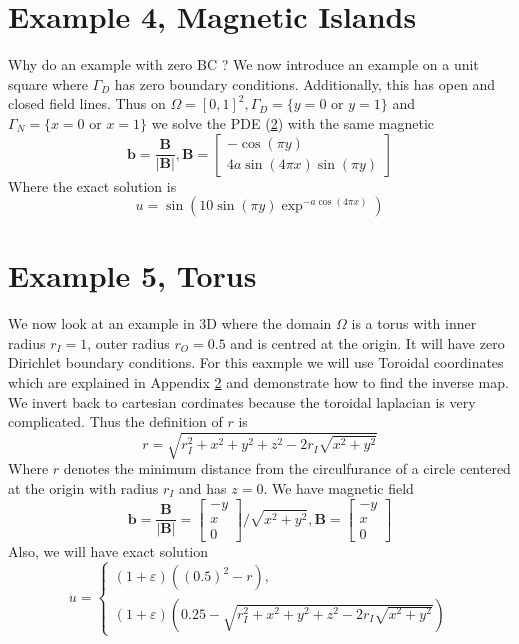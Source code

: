 \documentclass[12pt,a4paper]{article}
\begin{document}
\section{Example 4, Magnetic Islands}
Why do an example with zero BC ?
We now introduce an example on a unit square where $\Gamma_D$ has zero boundary conditions. Additionally, this has open and closed field lines.
Thus on $\Omega = [0,1]^2, \Gamma_D = \{y=0 \text{ or } y=1\}$ and $\Gamma_N = \{x=0 \text{ or } x=1\}$ we solve the PDE (\ref{}) with the same magnetic
\begin{equation}
\mathbf{b} = \frac{\mathbf{B}}{|\mathbf{B}|}, 
\mathbf{B} = \left[ \begin{matrix}
-\cos(\pi y)\\
4a \sin(4 \pi x) \sin(\pi y)
\end{matrix} \right]
\end{equation}
Where the exact solution is 
\begin{equation}
u = \sin(10 \sin(\pi y) \exp^{-a\cos(4 \pi x)}) 
\end{equation}

\section{Example 5, Torus}
We now look at an example in 3D where the domain $\Omega $ is a torus with inner radius $r_I = 1$, outer radius $r_O = 0.5$ and is centred at the origin. It will have zero Dirichlet boundary conditions. For this eaxmple we will use Toroidal coordinates which are explained in Appendix \ref{} and demonstrate how to find the inverse map. We invert back to cartesian cordinates because the toroidal laplacian \cite{} is very complicated. Thus the definition of $r$ is
\begin{equation}
r = \sqrt{r_I^2 + x^2 + y^2 + z^2 -2r_I\sqrt{x^2+y^2}}
\end{equation}
Where $r$ denotes the minimum distance from the circulfurance of a circle centered at the origin with radius $r_I$ and has $z=0$. We have magnetic field 
\begin{equation}
\mathbf{b} = \frac{\mathbf{B}}{|\mathbf{B}|} = 
\left[ \begin{matrix}
-y\\
 x \\
 0
\end{matrix} \right]/\sqrt{x^2+y^2}, 
\mathbf{B} = \left[ \begin{matrix}
-y\\
 x\\
 0
\end{matrix} \right]
\end{equation}
Also, we will have exact solution
\begin{equation}
u = 
\begin{cases}
(1+\varepsilon)((0.5)^2 - r ),\\
(1+\varepsilon)(0.25 -  \sqrt{r_I^2 + x^2 + y^2 + z^2 -2r_I\sqrt{x^2+y^2}})
\end{cases}
\end{equation}
\end{document}
